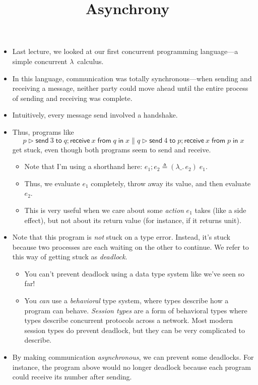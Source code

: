 \documentclass{lecturenotes}
\title{Asynchrony}
\newcommand{\abs}[2]{\ensuremath{\lambda #1.\,#2}}
\newcommand{\app}[2]{\ensuremath{#1\;#2}}
\newcommand{\utype}{\textsf{unit}\xspace}
\newcommand{\send}[2]{\ensuremath{\textsf{send}~#1 \mathrel{\textsf{to}} #2}}
\newcommand{\recv}[3]{\ensuremath{\textsf{receive}~#1 \mathrel{\textsf{from}} #2 \mathrel{\textsf{in}} #3}}
\begin{document}
\maketitle

\begin{itemize}
\item Last lecture, we looked at our first concurrent programming language---a simple concurrent $\lambda$~calculus.
\item In this language, communication was totally synchronous---when sending and receiving a message, neither party could move ahead until the entire process of sending and receiving was complete.
\item Intuitively, every message send involved a handshake.
\item Thus, programs like $$p \triangleright \send{3}{q}; \recv{x}{q}{x} \parallel q \triangleright \send{4}{p}; \recv{x}{p}{x}$$ get stuck, even though both programs seem to send and receive.
  \begin{itemize}
  \item Note that I'm using a shorthand here: $e_1; e_2 \triangleq \app{(\abs{\_}{e_2})}{e_1}$.
  \item Thus, we evaluate $e_1$ completely, throw away its value, and then evaluate $e_2$.
  \item This is very useful when we care about some \emph{action} $e_1$ takes (like a side effect), but not about its return value (for instance, if it returns \utype).
  \end{itemize}
\item Note that this program is \emph{not} stuck on a type error.
  Instead, it's stuck because two processes are each waiting on the other to continue.
  We refer to this way of getting stuck as \emph{deadlock}.
  \begin{itemize}
  \item You can't prevent deadlock using a data type system like we've seen so far!
  \item You \emph{can} use a \emph{behavioral} type system, where types describe how a program can behave.
    \emph{Session types} are a form of behavioral types where types describe concurrent protocols across a network.
    Most modern session types do prevent deadlock, but they can be very complicated to describe.
  \end{itemize}
\item By making communication \emph{asynchronous}, we can prevent some deadlocks.
  For instance, the program above would no longer deadlock because each program could receive its number after sending.

\end{itemize}
\end{document}
